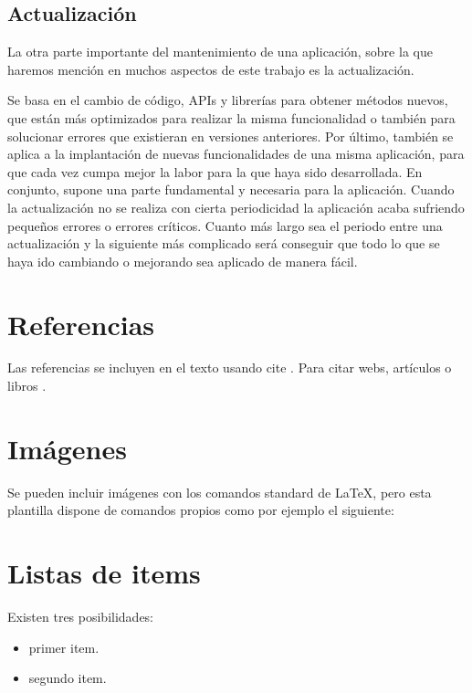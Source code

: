 \subsection{Actualización}

La otra parte importante del mantenimiento de una aplicación, sobre la que haremos mención en muchos aspectos de este trabajo es la actualización. 

Se basa en el cambio de código, APIs y librerías para obtener métodos nuevos, que están más optimizados para realizar la misma funcionalidad o también para solucionar errores que existieran en versiones anteriores. Por último, también se aplica a la implantación de nuevas funcionalidades de una misma aplicación, para que cada vez cumpa mejor la labor para la que haya sido desarrollada. En conjunto, supone una parte fundamental y necesaria para la aplicación. Cuando la actualización no se realiza con cierta periodicidad la aplicación acaba sufriendo pequeños errores o errores críticos. Cuanto más largo sea el periodo entre una actualización y la siguiente más complicado será conseguir que todo lo que se haya ido cambiando o mejorando sea aplicado de manera fácil.



\section{Referencias}

Las referencias se incluyen en el texto usando cite \cite{wiki:latex}. Para citar webs, artículos o libros \cite{koza92}.


\section{Imágenes}

Se pueden incluir imágenes con los comandos standard de \LaTeX, pero esta plantilla dispone de comandos propios como por ejemplo el siguiente:




\section{Listas de items}

Existen tres posibilidades:

\begin{itemize}
	\item primer item.
	\item segundo item.
\end{itemize}

